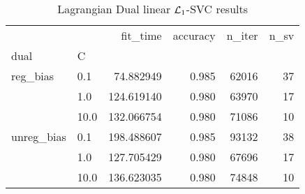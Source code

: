 \begin{table}[H]
\centering
\caption{Lagrangian Dual linear $\protect \mathcal{L}_1$-SVC results}
\label{linear_lagrangian_dual_l1_svc_cv_results}
\begin{tabular}{llrrrr}
\toprule
           &      &    fit\_time &  accuracy &  n\_iter &  n\_sv \\
dual & C &             &           &         &       \\
\midrule
reg\_bias & 0.1  &   74.882949 &     0.985 &   62016 &    37 \\
           & 1.0  &  124.619140 &     0.980 &   63970 &    17 \\
           & 10.0 &  132.066754 &     0.980 &   71086 &    10 \\
unreg\_bias & 0.1  &  198.488607 &     0.985 &   93132 &    38 \\
           & 1.0  &  127.705429 &     0.980 &   67696 &    17 \\
           & 10.0 &  136.623035 &     0.980 &   74848 &    10 \\
\bottomrule
\end{tabular}
\end{table}
